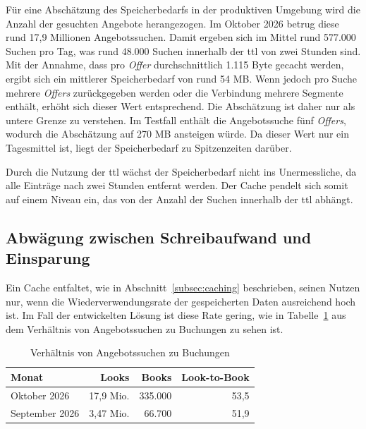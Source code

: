 Für eine Abschätzung des Speicherbedarfs in der produktiven Umgebung wird die Anzahl der gesuchten Angebote herangezogen. Im Oktober 2026 betrug diese rund 17,9 Millionen Angebotssuchen. %
Damit ergeben sich im Mittel rund 577.000 Suchen pro Tag, was rund 48.000 Suchen innerhalb der \ac{ttl} von zwei Stunden sind. Mit der Annahme, dass pro \textit{Offer} durchschnittlich 1.115 Byte gecacht werden, ergibt sich ein mittlerer Speicherbedarf von rund 54 MB. Wenn jedoch pro Suche mehrere \textit{Offers} zurückgegeben werden oder die Verbindung mehrere Segmente enthält, erhöht sich dieser Wert entsprechend. Die Abschätzung ist daher nur als untere Grenze zu verstehen. Im Testfall enthält die Angebotssuche fünf \textit{Offers}, wodurch die Abschätzung auf 270 MB ansteigen würde. Da dieser Wert nur ein Tagesmittel ist, liegt der Speicherbedarf zu Spitzenzeiten darüber.

Durch die Nutzung der \ac{ttl} wächst der Speicherbedarf nicht ins Unermessliche, da alle Einträge nach zwei Stunden entfernt werden. Der Cache pendelt sich somit auf einem Niveau ein, das von der Anzahl der Suchen innerhalb der \ac{ttl} abhängt.

\subsection{Abwägung zwischen Schreibaufwand und Einsparung}
\label{subsec:abwaegung}

Ein Cache entfaltet, wie in Abschnitt~\ref{subsec:caching} beschrieben, seinen Nutzen nur, wenn die Wiederverwendungsrate der gespeicherten Daten ausreichend hoch ist. Im Fall der entwickelten Lösung ist diese Rate gering, wie in Tabelle~\ref{tab:look_to_book} aus dem Verhältnis von Angebotssuchen zu Buchungen zu sehen ist.

\begin{table}[htbp]
    \centering
    \begin{tabular}{l r r r}
        \hline
        \textbf{Monat} & \textbf{Looks} & \textbf{Books} & \textbf{Look-to-Book} \\
        \hline
        Oktober 2026 & 17,9 Mio. & 335.000 & 53,5 \\
        September 2026 & 3,47 Mio. & 66.700 & 51,9 \\
        \hline
    \end{tabular}
    \caption{Verhältnis von Angebotssuchen zu Buchungen} %
    \label{tab:look_to_book}
\end{table}

